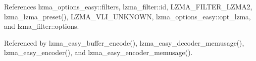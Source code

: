 References lzma\-\_\-options\-\_\-easy\-::filters, lzma\-\_\-filter\-::id, L\-Z\-M\-A\-\_\-\-F\-I\-L\-T\-E\-R\-\_\-\-L\-Z\-M\-A2, lzma\-\_\-lzma\-\_\-preset(), L\-Z\-M\-A\-\_\-\-V\-L\-I\-\_\-\-U\-N\-K\-N\-O\-W\-N, lzma\-\_\-options\-\_\-easy\-::opt\-\_\-lzma, and lzma\-\_\-filter\-::options.



Referenced by lzma\-\_\-easy\-\_\-buffer\-\_\-encode(), lzma\-\_\-easy\-\_\-decoder\-\_\-memusage(), lzma\-\_\-easy\-\_\-encoder(), and lzma\-\_\-easy\-\_\-encoder\-\_\-memusage().

